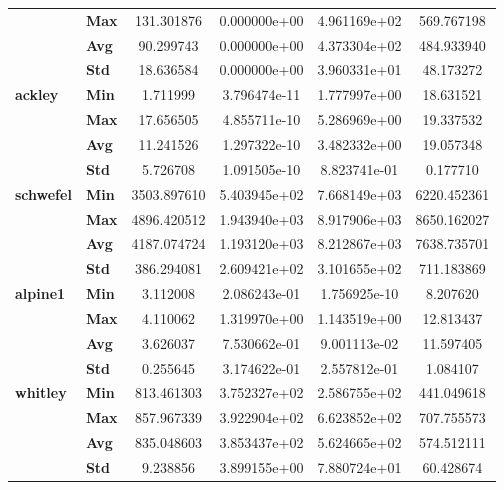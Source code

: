 \begin{longtable}{llcccc}
            & \textbf{Max} &   131.301876 &  0.000000e+00 &   4.961169e+02 &   569.767198 \\
            & \textbf{Avg} &    90.299743 &  0.000000e+00 &   4.373304e+02 &   484.933940 \\
            & \textbf{Std} &    18.636584 &  0.000000e+00 &   3.960331e+01 &    48.173272 \\
\cline{1-6}
\multirow{4}{*}{\textbf{ackley}} & \textbf{Min} &     1.711999 &  3.796474e-11 &   1.777997e+00 &    18.631521 \\
            & \textbf{Max} &    17.656505 &  4.855711e-10 &   5.286969e+00 &    19.337532 \\
            & \textbf{Avg} &    11.241526 &  1.297322e-10 &   3.482332e+00 &    19.057348 \\
            & \textbf{Std} &     5.726708 &  1.091505e-10 &   8.823741e-01 &     0.177710 \\
\cline{1-6}
\multirow{4}{*}{\textbf{schwefel}} & \textbf{Min} &  3503.897610 &  5.403945e+02 &   7.668149e+03 &  6220.452361 \\
            & \textbf{Max} &  4896.420512 &  1.943940e+03 &   8.917906e+03 &  8650.162027 \\
            & \textbf{Avg} &  4187.074724 &  1.193120e+03 &   8.212867e+03 &  7638.735701 \\
            & \textbf{Std} &   386.294081 &  2.609421e+02 &   3.101655e+02 &   711.183869 \\
\cline{1-6}
\multirow{4}{*}{\textbf{alpine1}} & \textbf{Min} &     3.112008 &  2.086243e-01 &   1.756925e-10 &     8.207620 \\
            & \textbf{Max} &     4.110062 &  1.319970e+00 &   1.143519e+00 &    12.813437 \\
            & \textbf{Avg} &     3.626037 &  7.530662e-01 &   9.001113e-02 &    11.597405 \\
            & \textbf{Std} &     0.255645 &  3.174622e-01 &   2.557812e-01 &     1.084107 \\
\cline{1-6}
\multirow{4}{*}{\textbf{whitley}} & \textbf{Min} &   813.461303 &  3.752327e+02 &   2.586755e+02 &   441.049618 \\
            & \textbf{Max} &   857.967339 &  3.922904e+02 &   6.623852e+02 &   707.755573 \\
            & \textbf{Avg} &   835.048603 &  3.853437e+02 &   5.624665e+02 &   574.512111 \\
            & \textbf{Std} &     9.238856 &  3.899155e+00 &   7.880724e+01 &    60.428674 \\

\end{longtable}
